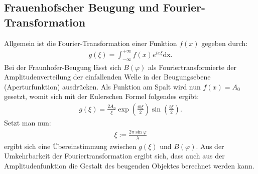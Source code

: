 \subsection{Frauenhofscher Beugung und Fourier-Transformation}
Allgemein ist die Fourier-Transformation einer Funktion $f(x)$ gegeben durch:
\begin{align}
g(\xi) = \int_{-\infty}^{+\infty} f(x)e^{ix\xi}\text{dx.} \label{eq7}
\end{align}
Bei der Fraunhofer-Beugung lässt sich $B(\varphi)$ als Fouriertransformierte der Amplitudenverteilung der einfallenden Welle in der Beugungsebene (Aperturfunktion) ausdrücken.
Als Funktion am Spalt wird nun $f(x)=A_0$ gesetzt, womit sich mit der Eulerschen Formel folgendes ergibt:
\begin{align}
g(\xi)=\frac{2A_{0}}{\xi}\exp\left(\frac{ib\xi}{2}\right)\sin\left(\frac{b\xi}{2}\right)\text{.}
\end{align}
Setzt man nun:
\begin{align}
\xi := \frac{2\pi\sin\varphi}{\lambda}
\end{align}
ergibt sich eine Übereinstimmung zwischen $g(\xi)$ und $B(\varphi)$. Aus der Umkehrbarkeit der Fouriertransformation ergibt sich, dass auch aus der Amplitudenfunktion die Gestalt des beugenden Objektes berechnet werden kann.

